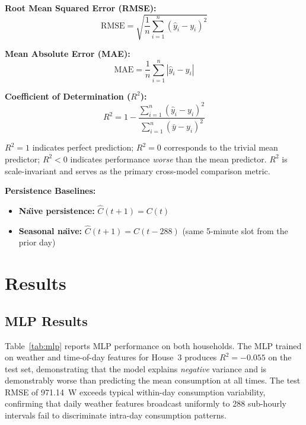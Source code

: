\documentclass[12pt,a4paper]{article}
\begin{document}
\noindent\textbf{Root Mean Squared Error (RMSE):}
\begin{equation}
  \text{RMSE} = \sqrt{\frac{1}{n}\sum_{i=1}^n (\hat{y}_i - y_i)^2}
  \label{eq:rmse}
\end{equation}

\noindent\textbf{Mean Absolute Error (MAE):}
\begin{equation}
  \text{MAE} = \frac{1}{n}\sum_{i=1}^n |\hat{y}_i - y_i|
  \label{eq:mae}
\end{equation}

\noindent\textbf{Coefficient of Determination ($R^2$):}
\begin{equation}
  R^2 = 1 - \frac{\sum_{i=1}^n (\hat{y}_i - y_i)^2}{\sum_{i=1}^n (\bar{y} - y_i)^2}
  \label{eq:r2}
\end{equation}

$R^2 = 1$ indicates perfect prediction; $R^2 = 0$ corresponds to the trivial
mean predictor; $R^2 < 0$ indicates performance \emph{worse} than the mean
predictor. $R^2$ is scale-invariant and serves as the primary cross-model
comparison metric.

\noindent\textbf{Persistence Baselines:}

\begin{itemize}
  \item \textbf{Na\"{\i}ve persistence:} $\hat{C}(t+1) = C(t)$
  \item \textbf{Seasonal na\"{\i}ve:} $\hat{C}(t+1) = C(t - 288)$ (same 5-minute slot from the prior day)
\end{itemize}

\section{Results}
\label{sec:results}

\subsection{MLP Results}

Table~\ref{tab:mlp} reports MLP performance on both households. The MLP
trained on weather and time-of-day features for House~3 produces $R^2 = -0.055$
on the test set, demonstrating that the model explains \emph{negative} variance
and is demonstrably worse than predicting the mean consumption at all times.
The test RMSE of 971.14~W exceeds typical within-day consumption variability,
confirming that daily weather features broadcast uniformly to 288 sub-hourly
intervals fail to discriminate intra-day consumption patterns.
\end{document}
